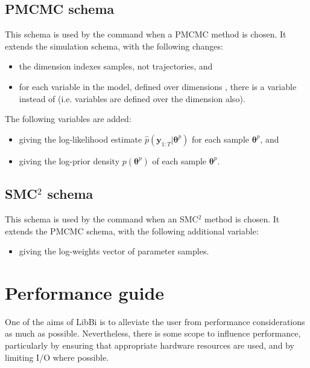 \subsection{PMCMC schema}

This schema is used by the  command when a PMCMC method is
chosen. It extends the simulation schema, with the following changes:
\begin{itemize}
\item the  dimension indexes samples, not trajectories, and
\item for each  variable  in the model,
  defined over dimensions , there is a variable
   instead of
   (i.e.  variables are
  defined over the  dimension also).
\end{itemize}
The following variables are added:
\begin{itemize}
\item {} giving the log-likelihood estimate
  $\hat{p}(\mathbf{y}_{1:T}|\boldsymbol{\theta}^p)$ for each sample
  $\boldsymbol{\theta}^p$, and
\item {} giving the log-prior density
  $p(\boldsymbol{\theta}^p)$ of each sample $\boldsymbol{\theta}^p$.
\end{itemize}

\subsection{SMC$^2$ schema}

This schema is used by the  command when an SMC$^2$ method
is chosen. It extends the PMCMC schema, with the following additional
variable:
\begin{itemize}
\item {} giving the log-weights vector of parameter samples.
\end{itemize}

\section{Performance guide\label{Performance guide}}

One of the aims of LibBi is to alleviate the user from performance
considerations as much as possible. Nevertheless, there is some scope to
influence performance, particularly by ensuring that appropriate hardware
resources are used, and by limiting I/O where possible.

